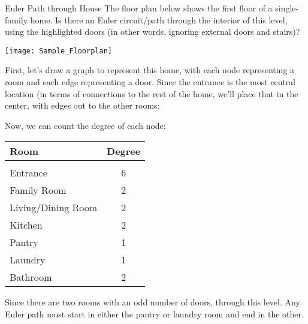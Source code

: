 \begin{example}[https://www.youtube.com/watch?v=tBkGIznLGZo&list=PLfmpjsIzhztst_PxJXo574wshSwxU9Yg_&index=5]{Euler Path through House}
The floor plan below shows the first floor of a single-family home.  Is there an Euler circuit/path through the interior of this level, using the highlighted doors (in other words, ignoring external doors and stairs)?
\begin{center}
\texttt{[image: Sample\_Floorplan]}
\end{center}

\sol
First, let's draw a graph to represent this home, with each node representing a room and each edge representing a door.  Since the entrance is the most central location (in terms of connections to the rest of the home, we'll place that in the center, with edges out to the other rooms:
\begin{center}
\end{center}

Now, we can count the degree of each node:
\begin{center}
\begin{tabular}{l c}
\textbf{Room} & \textbf{Degree}\\
\hline
& \\
Entrance & 6\\
Family Room & 2\\
Living/Dining Room & 2\\
Kitchen & 2\\
Pantry & 1\\
Laundry & 1\\
Bathroom & 2
\end{tabular}
\end{center}

Since there are two rooms with an odd number of doors,  through this level.  Any Euler path must start in either the pantry or laundry room and end in the other.
\end{example}
\pagebreak

